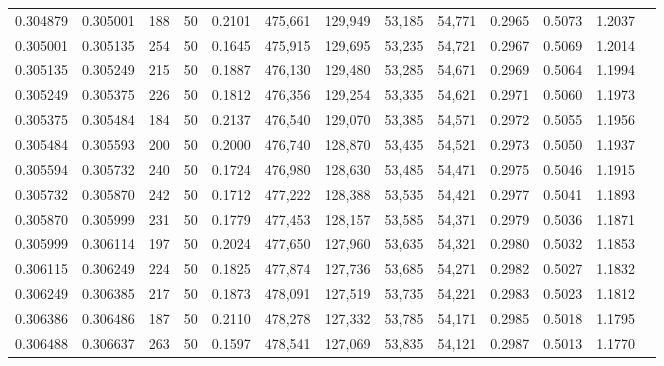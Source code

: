 \begin{tabular}{rrrrrrrrrrrrr}
0.304879 & 0.305001 &   188 &  50 &                                     0.2101 & 475,661 & 129,949 &  53,185 &  54,771 & 0.2965 & 0.5073 & 1.2037 \\
0.305001 & 0.305135 &   254 &  50 &                                     0.1645 & 475,915 & 129,695 &  53,235 &  54,721 & 0.2967 & 0.5069 & 1.2014 \\
0.305135 & 0.305249 &   215 &  50 &                                     0.1887 & 476,130 & 129,480 &  53,285 &  54,671 & 0.2969 & 0.5064 & 1.1994 \\
0.305249 & 0.305375 &   226 &  50 &                                     0.1812 & 476,356 & 129,254 &  53,335 &  54,621 & 0.2971 & 0.5060 & 1.1973 \\
0.305375 & 0.305484 &   184 &  50 &                                     0.2137 & 476,540 & 129,070 &  53,385 &  54,571 & 0.2972 & 0.5055 & 1.1956 \\
0.305484 & 0.305593 &   200 &  50 &                                     0.2000 & 476,740 & 128,870 &  53,435 &  54,521 & 0.2973 & 0.5050 & 1.1937 \\
0.305594 & 0.305732 &   240 &  50 &                                     0.1724 & 476,980 & 128,630 &  53,485 &  54,471 & 0.2975 & 0.5046 & 1.1915 \\
0.305732 & 0.305870 &   242 &  50 &                                     0.1712 & 477,222 & 128,388 &  53,535 &  54,421 & 0.2977 & 0.5041 & 1.1893 \\
0.305870 & 0.305999 &   231 &  50 &                                     0.1779 & 477,453 & 128,157 &  53,585 &  54,371 & 0.2979 & 0.5036 & 1.1871 \\
0.305999 & 0.306114 &   197 &  50 &                                     0.2024 & 477,650 & 127,960 &  53,635 &  54,321 & 0.2980 & 0.5032 & 1.1853 \\
0.306115 & 0.306249 &   224 &  50 &                                     0.1825 & 477,874 & 127,736 &  53,685 &  54,271 & 0.2982 & 0.5027 & 1.1832 \\
0.306249 & 0.306385 &   217 &  50 &                                     0.1873 & 478,091 & 127,519 &  53,735 &  54,221 & 0.2983 & 0.5023 & 1.1812 \\
0.306386 & 0.306486 &   187 &  50 &                                     0.2110 & 478,278 & 127,332 &  53,785 &  54,171 & 0.2985 & 0.5018 & 1.1795 \\
0.306488 & 0.306637 &   263 &  50 &                                     0.1597 & 478,541 & 127,069 &  53,835 &  54,121 & 0.2987 & 0.5013 & 1.1770 \\

\end{tabular}
